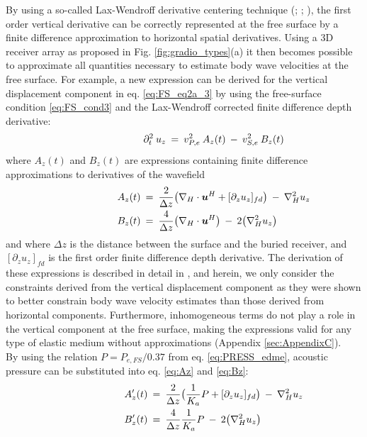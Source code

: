 \documentclass[]{article}
\begin{document}
	By using a so-called Lax-Wendroff derivative centering technique (\cite{lax1964difference}; \cite{blanch1997modified}; \cite{curtis2002volumetric}), the first order vertical derivative can be correctly represented at the free surface by a finite difference approximation to horizontal spatial derivatives. Using a 3D receiver array as proposed in Fig. \ref{fig:gradio_types}(a) it then becomes possible to approximate all quantities necessary to estimate body wave velocities at the free surface. For example, a new expression can be derived for the vertical displacement component in eq. \eqref{eq:FS_eq2a_3} by using the free-surface condition \eqref{eq:FS_cond3} and the Lax-Wendroff corrected finite difference depth derivative:
	\begin{align} \shoveright \shoveright \shoveright \shoveright \shoveright \shoveright 
		\partial_{t}^{2} \: u_{z} \: =  \: v_{P,e}^{2} \: A_{z}(t) \: - \: v_{S,e}^{2} \: B_{z}(t)  
		\label{eq:freeSurfT}   
	\end{align} 
	where $A_{z}(t)$ and $B_{z}(t)$ are expressions containing finite difference approximations to derivatives of the wavefield
	\begin{align} \shoveright \shoveright \shoveright \shoveright \shoveright \shoveright 
		A_{z}(t)  	\: &= \:   \frac{2}{\Delta z} \big(\nabla_{H} \cdot \bm{u}^{H} + [\partial_{z} u_{z}]_{fd} \big) \: - \: \nabla^{2}_{H} u_{z} \label{eq:Az} \\ 
		B_{z}(t) 	\: &= \:   \frac{4}{\Delta z} \big(\nabla_{H} \cdot \bm{u}^{H}\big) \: - \: 2\big(\nabla^{2}_{H}u_{z}\big)
		\label{eq:Bz}   
	\end{align}
	and where $\Delta z$ is the distance between the surface and the buried receiver, and $[\partial_{z} u_{z}]_{fd}$ is the first order finite difference depth derivative. The derivation of these expressions is described in detail in \textcite{curtis2002volumetric}, and herein, we only consider the constraints derived from the vertical displacement component as they were shown to better constrain body wave velocity estimates than those derived from horizontal components. Furthermore, inhomogeneous terms do not play a role in the vertical component at the free surface, making the expressions valid for any type of elastic medium without approximations (Appendix \ref{sec:AppendixC}). \\
	
	By using the relation $P=P_{e,FS}/0.37$ from eq. \eqref{eq:PRESS_edme}, acoustic pressure can be substituted into eq. \eqref{eq:Az} and \eqref{eq:Bz}:
	\begin{align} \shoveright \shoveright \shoveright \shoveright \shoveright \shoveright 
		A_{z}'(t)  	\: &= \:   \frac{2}{\Delta z} \big(\frac{1}{K_{a}}P + [\partial_{z} u_{z}]_{fd} \big) \: - \: \nabla^{2}_{H} u_{z} \label{eq:Az_new}  \\
		B_{z}'(t) 	\: &= \:   \frac{4}{\Delta z} \frac{1}{K_{a}}P \: - \: 2\big(\nabla^{2}_{H}u_{z}\big)
		\label{eq:Bz_new}   
	\end{align}
	
\end{document}

